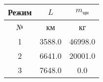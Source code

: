 \begin{tabular}{|c|c|c|}
\hline
Режим & $L$ & $m_{цн}$ \\ 
\hline
№ & км & кг \\ 
\hline
1 & 3588.0 & 46998.0 \\ 
\hline
2 & 6641.0 & 20001.0 \\ 
\hline
3 & 7648.0 & 0.0 \\ 
\hline
\end{tabular}